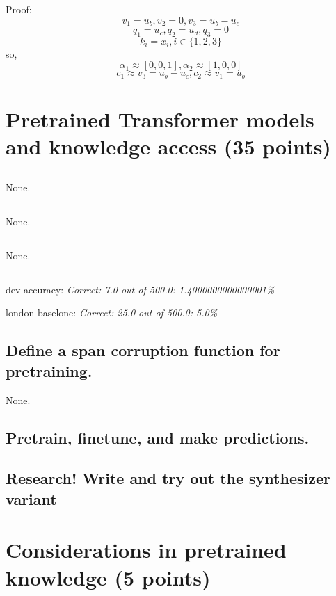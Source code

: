 \documentclass{homework}
\begin{document}
Proof:
$$
v_{1}=u_{b}, v_{2}=0, v_{3}=u_{b}-u_{c}
$$
$$
q_{1}=u_{c}, q_{2}=u_d, q_{3}=0
$$
$$
k_i=x_i, i\in \{1,2,3\}
$$
\quad so,
$$
\alpha_{1} \approx[0,0,1], \alpha_{2} \approx[1,0,0]
$$
$$
c_{1} \approx v_{3}=u_{b}-u_{c}, c_{2} \approx v_{1}=u_{b}
$$



\section{Pretrained Transformer models and knowledge access (35 points)}
\subsection{} None.
\subsection{} None.
\subsection{} None.
\subsection{}
dev accuracy: \textsl{Correct: 7.0 out of 500.0: 1.4000000000000001\%}

london baselone: \textsl{Correct: 25.0 out of 500.0: 5.0\%}

\subsection{Define a span corruption function for pretraining.}
None.

\subsection{Pretrain, finetune, and make predictions.}

\subsection{Research! Write and try out the synthesizer variant}

\section{Considerations in pretrained knowledge (5 points)}
\end{document}
